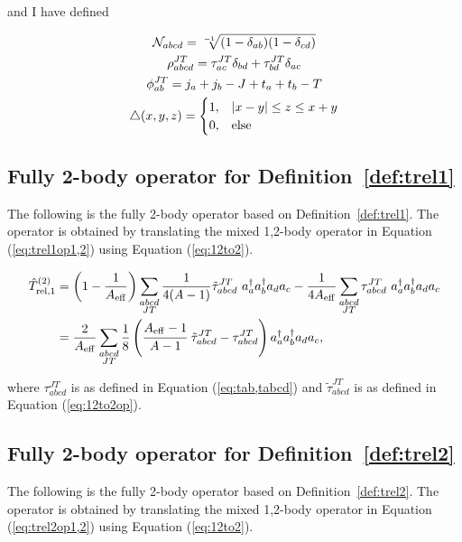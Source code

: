 \documentclass{article}
\def\aeff{A_{\rm{eff}}}
\def\trelopi_#1^#2{\hat{T}_{\rm{rel}, #1}^{#2}}
\def\creop{a^{\dagger}}
\def\annop{a}
\begin{document}
and I have defined

\begin{gather*}
  \mathcal{N}_{abcd} = \sqrt[-1]{(1-\delta_{ab})(1-\delta_{cd})}\\
  \rho_{abcd}^{JT} = \tau_{ac}^{JT}\delta_{bd} + \tau_{bd}^{JT}\delta_{ac}\\
  \phi_{ab}^{JT} = j_a+j_b-J + t_a+t_b-T\\
  \bigtriangleup(x,y,z) = 
  \begin{cases}
    1, & |x-y|\leq z\leq x+y\\
    0, & \rm{else}\\
  \end{cases}
\end{gather*}

\subsection{Fully 2-body operator for Definition~\ref{def:trel1}}
The following is the fully 2-body operator based on Definition~\ref{def:trel1}.
The operator is obtained by translating the mixed 1,2-body operator in
Equation (\ref{eq:trel1op1,2}) using Equation (\ref{eq:12to2}).

\begin{equation}\label{eq:trel1op2}
  \begin{aligned}
    \trelopi_1^{(2)} &= \left(1-\frac{1}{\aeff}\right)
    \displaystyle\sum_{\substack{abcd\\JT}} \frac{1}{4(A-1)}
    \tilde{\tau}_{abcd}^{JT}~\creop_a\creop_b\annop_d\annop_c
    -\frac{1}{4\aeff} \displaystyle\sum_{\substack{abcd\\JT}}
    \tau_{abcd}^{JT}~\creop_a\creop_b\annop_d\annop_c\\
    &= \frac{2}{\aeff} \displaystyle\sum_{\substack{abcd\\JT}}
    \frac{1}{8}\left(
    \cfrac{\aeff-1}{A-1}~\tilde{\tau}_{abcd}^{JT} - \tau_{abcd}^{JT}
    \right)\creop_a\creop_b\annop_d\annop_c,
  \end{aligned}
\end{equation}

where $\tau_{abcd}^{JT}$ is as defined in Equation (\ref{eq:tab,tabcd}) and
$\tilde{\tau}_{abcd}^{JT}$ is as defined in Equation (\ref{eq:12to2op}).

\subsection{Fully 2-body operator for Definition~\ref{def:trel2}}
The following is the fully 2-body operator based on Definition~\ref{def:trel2}.
The operator is obtained by translating the mixed 1,2-body operator in
Equation (\ref{eq:trel2op1,2}) using Equation (\ref{eq:12to2}).
\end{document}
